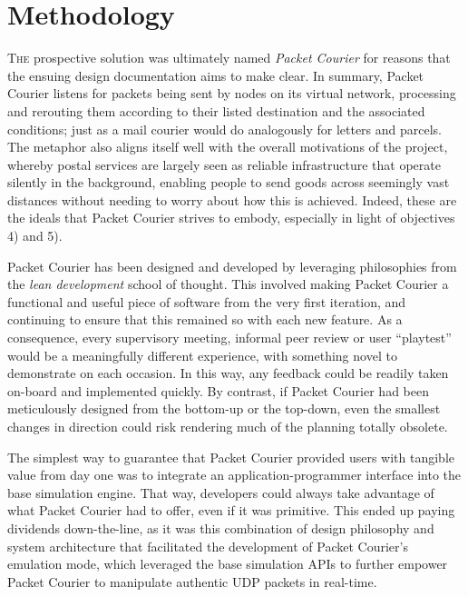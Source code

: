 \section{Methodology}

\lettrine{T}{he} prospective solution was ultimately named \emph{Packet Courier} for reasons that the ensuing design
documentation aims to make clear. In summary, Packet Courier listens for packets being sent by nodes on its virtual
network, processing and rerouting them according to their listed destination and the associated conditions; just as a
mail courier would do analogously for letters and parcels. The metaphor also aligns itself well with the overall
motivations of the project, whereby postal services are largely seen as reliable infrastructure that operate silently
in the background, enabling people to send goods across seemingly vast distances without needing to worry about how
this is achieved. Indeed, these are the ideals that Packet Courier strives to embody, especially in light of
objectives 4) and 5).

Packet Courier has been designed and developed by leveraging philosophies from the \emph{lean development} school of
thought\cite{william_feld_lean_book, steve_blank_lean_blog}. This involved making Packet Courier a functional and
useful piece of software from the very first iteration, and continuing to ensure that this remained so with each new
feature. As a consequence, every supervisory meeting, informal peer review or user ``playtest'' would be a
meaningfully different experience, with something novel to demonstrate on each occasion. In this way, any feedback
could be readily taken on-board and implemented quickly. By contrast, if Packet Courier had been meticulously
designed from the bottom-up or the top-down, even the smallest changes in direction could risk rendering much of the
planning totally obsolete.

The simplest way to guarantee that Packet Courier provided users with tangible value from day one was to integrate an
application-programmer interface into the base simulation engine. That way, developers could always take advantage of
what Packet Courier had to offer, even if it was primitive. This ended up paying dividends down-the-line, as it was this
combination of design philosophy and system architecture that facilitated the development of Packet Courier's
emulation mode, which leveraged the base simulation APIs to further empower Packet Courier to manipulate authentic
UDP packets in real-time.


